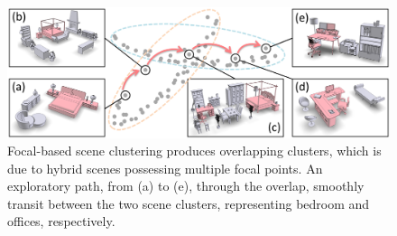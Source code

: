 
\begin{figure}[t]
\centering
    \includegraphics[width=0.99\linewidth]{fig/img/xu_sig14_expl}
    \caption{
    Focal-based scene clustering produces overlapping clusters, which is due to hybrid scenes possessing multiple focal points.
    An exploratory path, from (a) to (e), through the overlap, smoothly transit between the two scene clusters,
    representing bedroom and offices, respectively.}
    \label{fig:xu_sig14_expl}
\end{figure}
